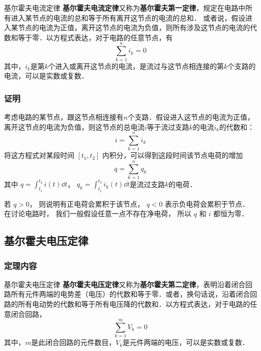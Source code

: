 

\begin{theorem}{基尔霍夫电流定律}
\textbf{基尔霍夫电流定律}又称为\textbf{基尔霍夫第一定律}，规定在电路中所有进入某节点的电流的总和等于所有离开这节点的电流的总和． 或者说，假设进入某节点的电流为正值，离开这节点的电流为负值，则所有涉及这节点的电流的代数和等于零．以方程式表达，对于电路的任意节点，有
\begin{equation}
\sum_{k=1}^n i_k =0
\end{equation}
其中，$i_k$是第$k$个进入或离开这节点的电流，是流过与这节点相连接的第$k$个支路的电流，可以是实数或复数．
\end{theorem}

\subsubsection{证明}
考虑电路的某节点，跟这节点相连接有$n$个支路．假设进入这节点的电流为正值，离开这节点的电流为负值，则这节点的总电流$i$等于流过支路$k$的电流$i_k$的代数和：
\begin{equation}
i=\sum_{k=1}^n i_k
\end{equation}
将这方程式对某段时间 $[t_1, t_2]$ 内积分，可以得到这段时间该节点电荷的增加
\begin{equation}
q=\sum_{k=1}^n q_k
\end{equation}
其中 $q = \int_{t_1}^{t_2} i(t) \dd{t}$， $q_k=\int_{t_1}^{t_2} i_k(t) \dd{t}$是流过支路$k$的电荷．

若 $q>0$， 则说明有正电荷会累积于该节点， $q < 0$ 表示负电荷会累积于节点． 在讨论电路时， 我们一般假设任意一点不存在净电荷， 所以 $q$ 和 $i$ 都恒为零．

\subsection{基尔霍夫电压定律}
\subsubsection{定理内容}
\begin{theorem}{基尔霍夫电压定律}
\textbf{基尔霍夫电压定律}又称为\textbf{基尔霍夫第二定律}，表明沿着闭合回路所有元件两端的电势差（电压）的代数和等于零．或者，换句话说，沿着闭合回路的所有电动势的代数和等于所有电压降的代数和．以方程式表达，对于电路的任意闭合回路，
\begin{equation}\label{Kirch_eq1}
\sum_{k=1}^m V_k = 0
\end{equation}
其中，$m$是此闭合回路的元件数目，$V_k$是元件两端的电压，可以是实数或复数．
\end{theorem}

